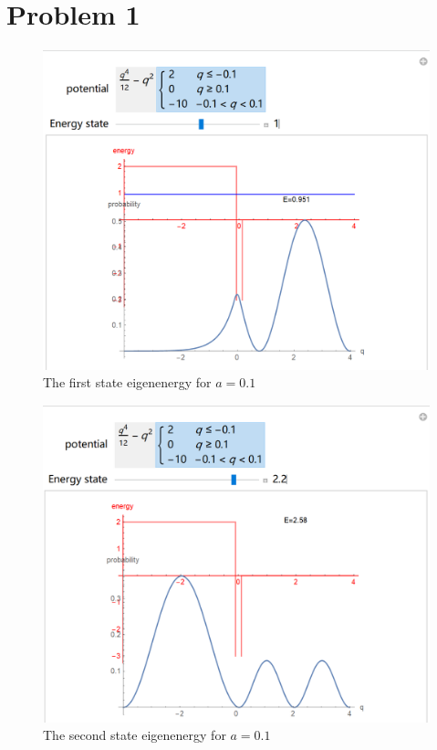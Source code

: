 \documentclass[a4paper]{article}
\begin{document}
\section{Problem 1}
    \begin{figure}[H]
        \centering
        \includegraphics[scale=0.2]{P1.png}
        \caption{The first state eigenenergy for $a=0.1$}
    \end{figure}
    \begin{figure}[H]
        \centering
        \includegraphics[scale=0.2]{P2.png}
        \caption{The second state eigenenergy for $a=0.1$}
    \end{figure}
\end{document}
